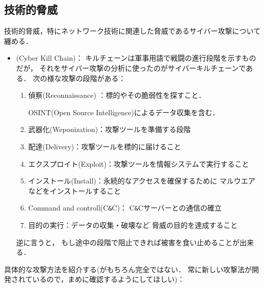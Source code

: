 \subsection{技術的脅威 }
技術的脅威，特にネットワーク技術に関連した脅威であるサイバー攻撃について纏める．
\begin{itemize}      
      \item 
          (Cyber Kill Chain)：
         キルチェーンは軍事用語で戦闘の進行段階を示すものだが，
         それをサイバー攻撃の分析に使ったのがサイバーキルチェーンである．
         次の様な攻撃の段階がある：
      \begin{enumerate}
         \item
            偵察(Reconnaissance) ：標的やその脆弱性を探すこと．
            
            OSINT(Open Source Intelligence)によるデータ収集を含む．
         \item
            武器化(Weponization)：攻撃ツールを準備する段階
         \item
            配達(Delivery)：攻撃ツールを標的に届けること
         \item
            エクスプロイト(Exploit)：攻撃ツールを情報システムで実行すること
         \item
            インストール(Install)：永続的なアクセスを確保するために
            マルウエアなどをインストールすること
         \item
            Command and controll(C\verb/&/C)：
            C\verb/&/Cサーバーとの通信の確立
         \item
            目的の実行：データの収集・破壊など
            脅威の目的を達成すること
      \end{enumerate}
      逆に言うと，
      もし途中の段階で阻止できれば被害を食い止めることが出来る．
   \end{itemize}
   具体的な攻撃方法を紹介する(がもちろん完全ではない．
   常に新しい攻撃法が開発されているので，まめに確認するようにしてほしい)：
